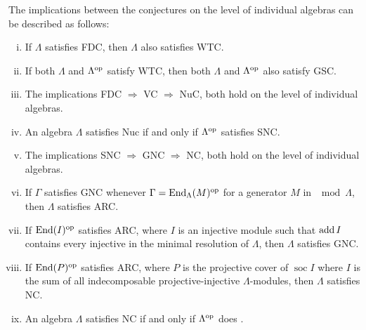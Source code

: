 \begin{prop}\label{prop:conj_on_individual_algebras}
	The implications between the conjectures on the level of individual algebras can be described as follows: 
	\begin{enumerate}[i)]
		\item If $\Lambda$ satisfies FDC, then $\Lambda$ also satisfies WTC.
		\item If both $\Lambda$ and $\Lambda^{\operatorname{op}}$ satisfy WTC, then both $\Lambda$ and $\Lambda^{\operatorname{op}}$ also satisfy GSC.
		\item The implications FDC $\Rightarrow$ VC $\Rightarrow$ NuC, both hold on the level of individual algebras.
		\item An algebra $\Lambda$ satisfies Nuc if and only if $\Lambda^{\operatorname{op}}$ satisfies SNC.
		\item The implications SNC $\Rightarrow$ GNC $\Rightarrow$ NC, both hold on the level of individual algebras.
		\item If $\Gamma$ satisfies GNC whenever $\Gamma = \operatorname{End}_\Lambda(M)^{\operatorname{op}}$ for a generator $M$ in $\mod\Lambda$, then $\Lambda$ satisfies ARC.
		\item If $\operatorname{End}(I)^{\operatorname{op}}$ satisfies ARC, where $I$ is an injective module such that $\operatorname{add} I$ contains every injective in the minimal resolution of $\Lambda$, then $\Lambda$ satisfies GNC.
		\item If $\operatorname{End}(P)^{\operatorname{op}}$ satisfies ARC, where $P$ is the projective cover of $\operatorname{soc}I$ where $I$ is the sum of all indecomposable projective-injective $\Lambda$-modules, then $\Lambda$ satisfies NC. 
		\item An algebra $\Lambda$ satisfies NC if and only if $\Lambda^{\operatorname{op}}$ does \cite[Theorem~4]{Mu68}. 
	\end{enumerate}
\end{prop}

%